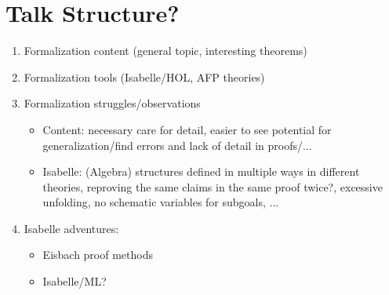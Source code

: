 \documentclass[runningheads]{llncs}
\begin{document}
	\section{Talk Structure?}
	\begin{enumerate}
		\item Formalization content (general topic, interesting theorems)
		\item Formalization tools (Isabelle/HOL, AFP theories)
		\item Formalization struggles/observations
		\begin{itemize}
			\item Content: necessary care for detail, easier to see potential for generalization/find errors and lack of detail in proofs/...
			\item Isabelle: (Algebra) structures defined in multiple ways in different theories, reproving the same claims in the same proof twice?, excessive unfolding, no schematic variables for subgoals, ... 
		\end{itemize}
		\item Isabelle adventures:
		\begin{itemize}
			\item Eisbach proof methods
			\item Isabelle/ML?
		\end{itemize}
	\end{enumerate}
	
\end{document}
